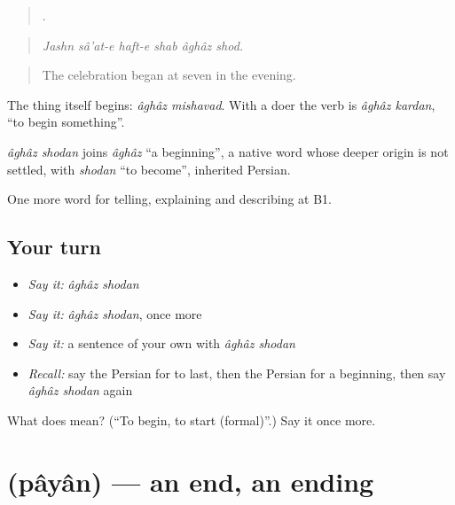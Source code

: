 \begin{quote}
     .
\end{quote}

\begin{quote}
\emph{Jashn sâ'at-e haft-e shab âghâz shod.}
\end{quote}

\begin{quote}
The celebration began at seven in the evening.
\end{quote}

The thing itself begins: \emph{âghâz mishavad}. With a doer the verb is \emph{âghâz kardan}, \textquotedblleft{}to begin something\textquotedblright{}.

\begin{cousinweb}
\emph{âghâz shodan} joins \emph{âghâz} \textquotedblleft{}a beginning\textquotedblright{}, a native word whose deeper origin is not settled, with \emph{shodan} \textquotedblleft{}to become\textquotedblright{}, inherited Persian.
\end{cousinweb}

\begin{grammarlens}[title={What you've built}]
One more word for telling, explaining and describing at B1.
\end{grammarlens}

\subsection*{Your turn}
\begin{itemize}
\raggedright
  \item \emph{Say it:} \emph{âghâz shodan}
  \item \emph{Say it:} \emph{âghâz shodan}, once more
  \item \emph{Say it:} a sentence of your own with \emph{âghâz shodan}
  \item \emph{Recall:} say the Persian for to last, then the Persian for a beginning, then say \emph{âghâz shodan} again
\end{itemize}

\begin{tcolorbox}[breakable,colback=teal!4,colframe=teal!35!black,title={Before you move on}]
What does   mean? (\textquotedblleft{}To begin, to start (formal)\textquotedblright{}.) Say it once more.
\end{tcolorbox}
\section[\texorpdfstring{\fa{پایان} (pâyân)}{پایان (pâyân)}]{ (pâyân) — an end, an ending}

